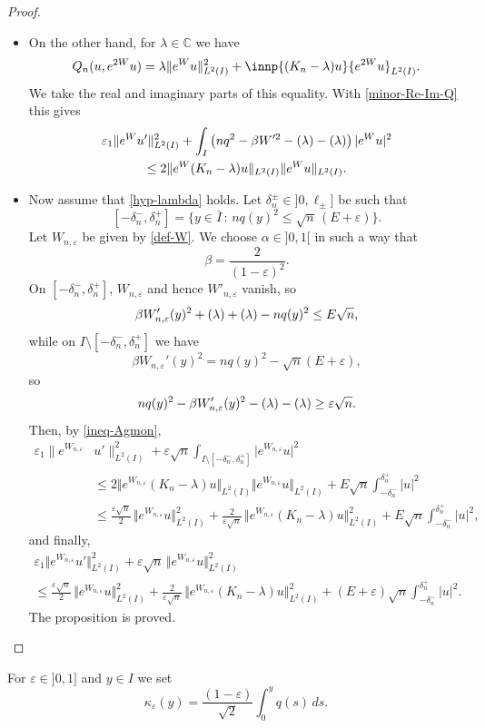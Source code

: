 \documentclass[10pt]{amsart}
\theoremstyle{plain}
\theoremstyle{definition}
\newcommand{\abs}[1]{\vert #1\vert}
\newcommand{\nr}[1]{\Vert #1\Vert}
\newcommand{\bnr}[1]{\bigl\Vert #1\bigr\Vert}
\newcommand{\set}[1]{\{ #1\}}
\newcommand{\1}{\mathds 1}
\newcommand{\st}{\,:\,}
\let\Re\relax
\DeclareMathOperator{\Re}{\mathsf{Re}\mkern2mu}
\let\Im\relax
\DeclareMathOperator{\Im}{\mathsf{Im}\mkern2mu}
\def\C{\mathbb{C}}
\let\b\beta
\let\d\delta
\let\e\varepsilon
\let\l\lambda
\begin{document}
\begin{proof}
\begin{itemize}
\item
On the other hand, for $\l \in \C$ we have
\[
Q_n (u,e^{2W}u) = \l \nr{e^W u}^2_{L^2(I)} + \innp{(K_n-\l)u}{e^{2W}u}_{L^2(I)}.
\]
We take the real and imaginary parts of this equality. With \eqref{minor-Re-Im-Q} this gives
\begin{multline} \label{ineq-Agmon}
\e_1 \nr{e^{W}u'}^2_{L^2(I)} + \int_{I} \left(nq^2 - \beta W'^2 - \Re(\l) - \Im(\l) \right) |e^W u|^2 \\
\leq 2 \nr{e^W (K_n-\l)u}_{L^2(I)} \nr{e^W u}_{L^2(I)}.
\end{multline}

\item
Now assume that \eqref{hyp-lambda} holds. Let $\d_n^\pm \in{}]0, \ell_\pm]$ be such that
\[
[-\d_n^-,\d_n^+] = \set{y \in \bar I \st nq(y)^2 \leq \sqrt{n}\,(E+\e)}.
\]
Let $W_{n,\e}$ be given by \eqref{def-W}. We choose $\alpha \in{}]0,1[$ in such a way that
\[
\beta = \frac {2}{(1-\e)^2}.
\]
On $[-\d_n^-,\d_n^+]$, $W_{n,\e}$ and hence $W'_{n,\e}$ vanish, so
\[
\beta W_{n,\e}'(y)^2 + \Re(\l) + \Im(\l) - nq(y)^2 \leq E \sqrt n,
\]
while on $I \setminus [-\d_n^-,\d_n^+]$ we have
\[
\b W_{n,\e}'(y)^2 = nq(y)^2 - \sqrt{n}(E+\e),
\]
so
\[
n q(y)^2 - \beta W_{n,\e}'(y)^2 - \Re(\l) - \Im(\l) \geq \e \sqrt n.
\]
Then, by \eqref{ineq-Agmon},
\begin{align*}
\e_1 \bigl\|e^{W_{n,\e}} &u'\bigr\|^2_{L^2(I)} + \e \sqrt n \int_{I \setminus [-\d_n^-,\d_n^+]} \abs{e^{W_{n,\e}} u}^2\\
& \leq 2 \bnr{e^{W_{n,\e}} (K_n-\l)u}_{L^2(I)} \bnr{e^{W_{n,\e}} u}_{L^2(I)} + E \sqrt n \int_{-\d_n^-}^{\d_n^+} \abs{u}^2\\
& \leq \frac {\e \sqrt n}2\, \bnr{e^{W_{n,\e}} u}^2_{L^2(I)} + \frac {2}{\e \sqrt n}\, \bnr{e^{W_{n,\e}} (K_n-\l)u}^2_{L^2(I)} + E \sqrt n \int_{-\d_n^-}^{\d_n^+} \abs{u}^2,
\end{align*}
and finally,
\begin{multline*}
\e_1 \bnr{e^{W_{n,\e}} u'}^2_{L^2(I)} + \e \sqrt n\,\bnr{e^{W_{n,\e}} u}^2_{L^2(I)}\\
\leq \frac {\e \sqrt n}{2}\, \bnr{e^{W_{n,\e}} u}^2_{L^2(I)} + \frac {2}{\e \sqrt n}\, \bnr{e^{W_{n,\e}} (K_n-\l)u}^2_{L^2(I)} + (E+\e) \sqrt n \int_{-\d_n^-}^{\d_n^+} \abs{u}^2.
\end{multline*}
The proposition is proved.\qedhere
\end{itemize}
\end{proof}

For $\e \in{}]0,1]$ and $y \in I$ we set
\[
\kappa_\e(y) = \frac {(1-\e)} {\sqrt 2} \int_0^y q(s) \, ds.
\]
\end{document}
